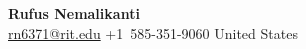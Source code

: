 \documentclass[10pt,letter]{article}
\begin{document}
\small

\begin{center}
  {\LARGE \bfseries Rufus Nemalikanti} \\[2pt]
  {\normalsize
  \href{mailto:rn6371@rit.edu}{rn6371@rit.edu} \quad \textbar \quad
  +1~585-351-9060 \quad \textbar \quad United States
  }
\end{center}




\end{document}
